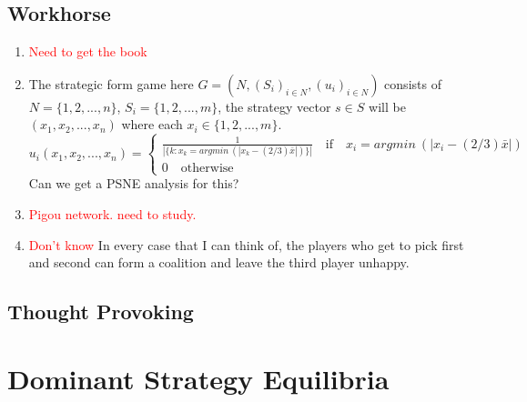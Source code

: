 \documentclass{article}
\begin{document}
\subsection{Workhorse}
\begin{enumerate}
	\item \textcolor{red}{Need to get the book}
	\item The strategic form game here $G = (N, (S_i)_{i \in N}, (u_i)_{i \in N})$ consists of $N = \{1,2, ..., n\}$, $S_i = \{1,2, ..., m\}$, the strategy vector $s \in S$ will be $(x_1, x_2, ..., x_n)$ where each $x_i \in \{1,2, ..., m\}$.
	\[
		u_i(x_1, x_2, ..., x_n) = 
		\begin{cases}
			\frac{1}{|\{k: x_k = argmin~(|x_k - (2/3)\bar{x}|)\}|} \quad \text{if} \quad x_i = argmin~(|x_i - (2/3)\bar{x}|)\\
			0 \quad \text{otherwise}
		\end{cases}
	\]
	Can we get a PSNE analysis for this?
	\item \textcolor{red}{Pigou network. need to study.}
	\item \textcolor{red}{Don't know} In every case that I can think of, the players who get to pick first and second can form a coalition and leave the third player unhappy.
\end{enumerate}
\subsection{Thought Provoking}

\section{Dominant Strategy Equilibria}
\end{document}
